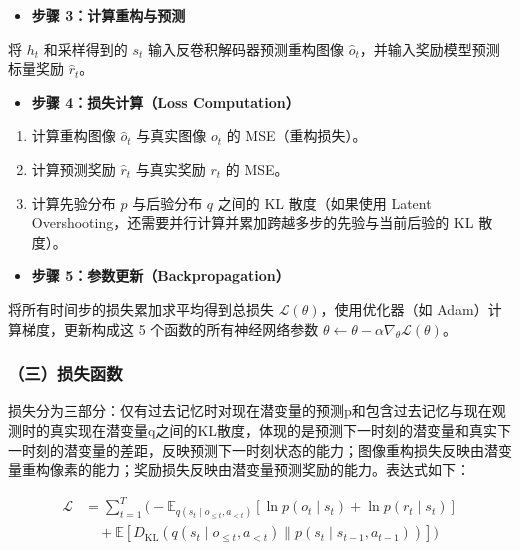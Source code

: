 \begin{itemize}
\tightlist
\item
  \textbf{步骤 3：计算重构与预测}
\end{itemize}

将 \(h_t\) 和采样得到的 \(s_t\) 输入反卷积解码器预测重构图像 \(\hat{o}_t\)，并输入奖励模型预测标量奖励 \(\hat{r}_t\)。

\begin{itemize}
\tightlist
\item
  \textbf{步骤 4：损失计算（Loss Computation）}
\end{itemize}

\begin{enumerate}
\def\labelenumi{\arabic{enumi}.}
\tightlist
\item
  计算重构图像 \(\hat{o}_t\) 与真实图像 \(o_t\) 的 MSE（重构损失）。
\item
  计算预测奖励 \(\hat{r}_t\) 与真实奖励 \(r_t\) 的 MSE。
\item
  计算先验分布 \(p\) 与后验分布 \(q\) 之间的 KL 散度（如果使用 Latent Overshooting，还需要并行计算并累加跨越多步的先验与当前后验的 KL 散度）。
\end{enumerate}

\begin{itemize}
\tightlist
\item
  \textbf{步骤 5：参数更新（Backpropagation）}
\end{itemize}

将所有时间步的损失累加求平均得到总损失 \(\mathcal{L}(\theta)\)，使用优化器（如 Adam）计算梯度，更新构成这 5 个函数的所有神经网络参数 \(\theta \leftarrow \theta - \alpha \nabla_{\theta}\mathcal{L}(\theta)\)。

\hypertarget{ux4e09ux635fux5931ux51fdux6570}{%
\subsubsection{（三）损失函数}\label{ux4e09ux635fux5931ux51fdux6570}}

损失分为三部分：仅有过去记忆时对现在潜变量的预测p和包含过去记忆与现在观测时的真实现在潜变量q之间的KL散度，体现的是预测下一时刻的潜变量和真实下一时刻的潜变量的差距，反映预测下一时刻状态的能力；图像重构损失反映由潜变量重构像素的能力；奖励损失反映由潜变量预测奖励的能力。表达式如下：

\[
\begin{aligned}
\mathcal{L}
&=
\sum_{t=1}^{T}
\Biggl(
-\mathbb{E}_{q(s_t \mid o_{\le t}, a_{<t})}
\left[\ln p(o_t \mid s_t) + \ln p(r_t \mid s_t)\right]
\\
&\quad+
\mathbb{E}
\left[
D_{\mathrm{KL}}\left(
q(s_t \mid o_{\le t}, a_{<t})
\parallel
p(s_t \mid s_{t-1}, a_{t-1})
\right)
\right]
\Biggr)
\end{aligned}
\]

